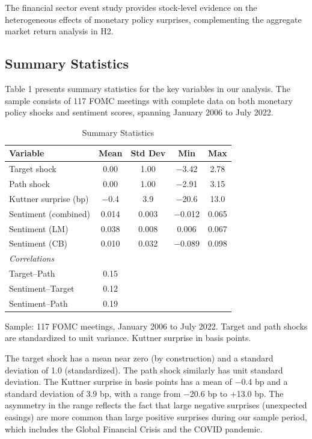 \documentclass[12pt]{article}
\begin{document}
The financial sector event study provides stock-level evidence on the heterogeneous effects of monetary policy surprises, complementing the aggregate market return analysis in H2.

\subsection{Summary Statistics}

Table 1 presents summary statistics for the key variables in our analysis. The sample consists of 117 FOMC meetings with complete data on both monetary policy shocks and sentiment scores, spanning January 2006 to July 2022.


\begin{table}[htbp]
\centering
\caption{Summary Statistics}
\label{tab:summary}
\begin{tabular}{lcccc}
\toprule
Variable & Mean & Std Dev & Min & Max \\
\midrule
Target shock & 0.00 & 1.00 & $-$3.42 & 2.78 \\
Path shock & 0.00 & 1.00 & $-$2.91 & 3.15 \\
Kuttner surprise (bp) & $-$0.4 & 3.9 & $-$20.6 & 13.0 \\
Sentiment (combined) & 0.014 & 0.003 & $-$0.012 & 0.065 \\
Sentiment (LM) & 0.038 & 0.008 & 0.006 & 0.067 \\
Sentiment (CB) & 0.010 & 0.032 & $-$0.089 & 0.098 \\
\midrule
\multicolumn{5}{l}{\textit{Correlations}} \\
Target--Path & 0.15 & & & \\
Sentiment--Target & 0.12 & & & \\
Sentiment--Path & 0.19 & & & \\
\bottomrule
\end{tabular}
\footnotesize{Sample: 117 FOMC meetings, January 2006 to July 2022. Target and path shocks are standardized to unit variance. Kuttner surprise in basis points.}
\end{table}


The target shock has a mean near zero (by construction) and a standard deviation of 1.0 (standardized). The path shock similarly has unit standard deviation. The Kuttner surprise in basis points has a mean of $-$0.4 bp and a standard deviation of 3.9 bp, with a range from $-$20.6 bp to +13.0 bp. The asymmetry in the range reflects the fact that large negative surprises (unexpected easings) are more common than large positive surprises during our sample period, which includes the Global Financial Crisis and the COVID pandemic.
\end{document}
